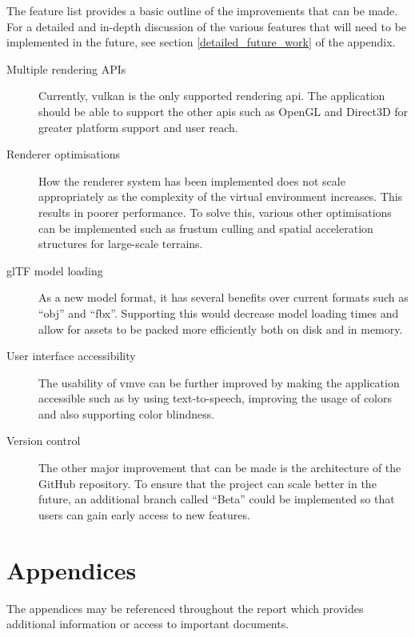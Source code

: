 \documentclass[11pt]{article}
\begin{document}
The feature list provides a basic outline of the improvements that can be made.
For a detailed and in-depth discussion of the various features that will need to
be implemented in the future, see section \ref{detailed_future_work} of the
appendix.
\begin{description}
  \item[Multiple rendering APIs] Currently, \gls*{vulkan} is the only supported
    rendering \gls*{api}. The application should be able to support the other
    \glspl*{api} such as OpenGL and Direct3D for greater platform support and
    user reach.
  \item[Renderer optimisations] How the renderer system has been implemented
    does not scale appropriately as the complexity of the virtual environment
    increases. This results in poorer performance. To solve this, various other
    optimisations can be implemented such as frustum culling and spatial
    acceleration structures for large-scale terrains.
  \item[glTF model loading] As a new model format, it has several benefits over
    current formats such as ``obj'' and ``fbx''. Supporting this would decrease
    model loading times and allow for assets to be packed more efficiently both
    on disk and in memory.
  \item[User interface accessibility]
    The usability of \gls*{vmve} can be further improved by making the
    application accessible such as by using text-to-speech, improving the usage
    of colors and also supporting color blindness.
  \item[Version control] The other major improvement that can be made is the
    architecture of the GitHub repository. To ensure that the project can scale
    better in the future, an additional branch called ``Beta'' could be
    implemented so that users can gain early access to new features.
  
\end{description}



\clearpage



\clearpage
\section{Appendices}
The appendices may be referenced throughout the report which provides additional
information or access to important documents.
\end{document}
